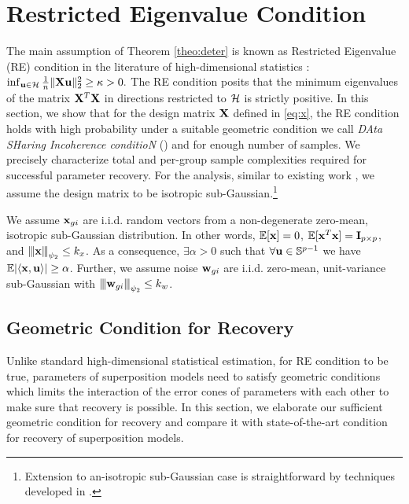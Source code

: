 \section{Restricted Eigenvalue Condition}
\label{sec:re}
The main assumption of Theorem \ref{theo:deter} is known as Restricted Eigenvalue (RE) condition in the literature of high-dimensional statistics \cite{banerjee14, nrwy12, raskutti10}:
$\inf_{\u \in \cH} \frac{1}{n} \norm{\X \u}{2}^2 \geq \kappa > 0.$
The RE condition posits that the minimum eigenvalues of the matrix $\mathbf{X}^T \mathbf{X}$ in directions restricted to $\cH$ is strictly positive.
In this section, we show that for the design matrix $\mathbf{X}$ defined in \eqref{eq:x}, the RE condition holds with high probability under a suitable geometric condition we call {\em DAta SHaring Incoherence conditioN} (\ds) and for enough number of samples.
We precisely characterize total and per-group sample complexities required for successful parameter recovery.
For the analysis, similar to existing work \cite{guba16, mend15, trop15}, we assume the design matrix to be isotropic sub-Gaussian.\footnote{Extension to an-isotropic sub-Gaussian case is straightforward by techniques developed in \cite{banerjee14, ruzh13}.}
\begin{definition}
	\label{def:obs}
	We assume $\mathbf{x}_{gi}$ are i.i.d. random vectors from a non-degenerate zero-mean, isotropic sub-Gaussian distribution. In other words, $\mathbb{E} [\mathbf{x}] = 0$, $\mathbb{E} [\mathbf{x}^T \mathbf{x}] = \mathbf{I}_{p \times p}$, and ${\left\vert\kern-0.25ex\left\vert\kern-0.25ex\left\vert \mathbf{x} \right\vert\kern-0.25ex\right\vert\kern-0.25ex\right\vert}_{\psi_2} \leq k_x$.	
As a consequence, $\exists \alpha > 0$ such that $\forall \mathbf{u} \in \mathbb S^{p-1}$ we have $ \mathbb{E}|\langle \mathbf{x}, \mathbf{u} \rangle| \geq \alpha$. Further, we assume noise $\mathbf{w}_{gi} $ are i.i.d.
zero-mean, unit-variance sub-Gaussian with ${\left\vert\kern-0.25ex\left\vert\kern-0.25ex\left\vert \mathbf{w}_{gi} \right\vert\kern-0.25ex\right\vert\kern-0.25ex\right\vert}_{\psi_2} \leq k_w$.
\end{definition}

\subsection{Geometric Condition for Recovery}
Unlike standard high-dimensional statistical estimation, for RE condition to be true, parameters of superposition models need to satisfy geometric conditions which limits the interaction of the error cones of parameters with each other to make sure that recovery is possible. In this section, we elaborate our sufficient geometric condition for recovery and compare it with state-of-the-art condition for recovery of superposition models. 

